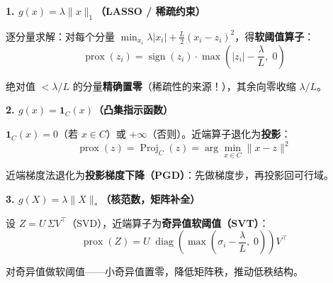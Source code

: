 \documentclass[12pt, a4paper]{ctexart}
\begin{document}
\begin{blackboard}[三个最重要的近端算子]

\textbf{1. $g(x) = \lambda\|x\|_1$（LASSO / 稀疏约束）}

逐分量求解：对每个分量 $\min_{x_i} \lambda|x_i| + \frac{L}{2}(x_i - z_i)^2$，得\textbf{软阈值算子}：
\[
\operatorname{prox}(z_i) = \operatorname{sign}(z_i)\cdot\max\!\left(|z_i| - \frac{\lambda}{L},\; 0\right)
\]

\begin{center}
\end{center}

绝对值 $< \lambda/L$ 的分量\textbf{精确置零}（稀疏性的来源！），其余向零收缩 $\lambda/L$。

\vspace{0.5em}
\textbf{2. $g(x) = \mathbf{1}_C(x)$（凸集指示函数）}

$\mathbf{1}_C(x) = 0$（若 $x \in C$）或 $+\infty$（否则）。近端算子退化为\textbf{投影}：
\[
\operatorname{prox}(z) = \operatorname{Proj}_C(z) = \arg\min_{x \in C} \|x - z\|^2
\]

近端梯度法退化为\textbf{投影梯度下降（PGD）}：先做梯度步，再投影回可行域。

\vspace{0.5em}
\textbf{3. $g(X) = \lambda\|X\|_*$（核范数，矩阵补全）}

设 $Z = U\,\Sigma V^\top$（SVD），近端算子为\textbf{奇异值软阈值（SVT）}：
\[
\operatorname{prox}(Z) = U\;\operatorname{diag}\!\left(\max\!\left(\sigma_i - \frac{\lambda}{L},\; 0\right)\right) V^\top
\]

对奇异值做软阈值——小奇异值置零，降低矩阵秩，推动低秩结构。

\end{blackboard}
\end{document}
